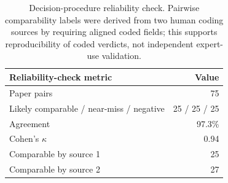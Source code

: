 \begin{table}[t]
\centering
\small
\begin{tabular}{lr}
\toprule
\textbf{Reliability-check metric} & \textbf{Value} \\
\midrule
Paper pairs & 75 \\
Likely comparable / near-miss / negative & 25 / 25 / 25 \\
Agreement & 97.3\% \\
Cohen's $\kappa$ & 0.94 \\
Comparable by source 1 & 25 \\
Comparable by source 2 & 27 \\
\bottomrule
\end{tabular}
\caption{Decision-procedure reliability check. Pairwise comparability labels were derived from two human coding sources by requiring aligned coded fields; this supports reproducibility of coded verdicts, not independent expert-use validation.}
\label{tab:comparability-pilot}
\end{table}
